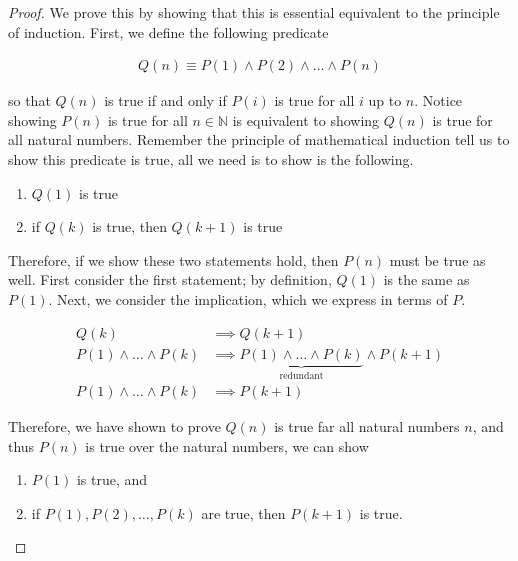 \documentclass[twoside]{report}
\begin{document}
\begin{proof}
	We prove this by showing that this is essential equivalent to the principle of induction. First, we define the following predicate
	
	\begin{align*}
		Q(n) \equiv P(1) \land P(2) \land \dots \land P(n)
	\end{align*}
	
	so that $Q(n)$ is true if and only if $P(i)$ is true for all $i$ up to $n$. Notice showing $P(n)$ is true for all $n \in \mathbb{N}$ is equivalent to showing $Q(n)$ is true for all natural numbers. Remember the principle of mathematical induction tell us to show this predicate is true, all we need is to show is the following.

	\vspace{\baselineskip}
	\begin{enumerate}
		\item $Q(1)$ is true
		\item if $Q(k)$ is true, then $Q(k + 1)$ is true
	\end{enumerate}
	\vspace{\baselineskip}

	Therefore, if we show these two statements hold, then $P(n)$ must be true as well. First consider the first statement; by definition, $Q(1)$ is the same as $P(1)$. Next, we consider the implication, which we express in terms of $P$.
	
	\begin{align*}
		Q(k) &\implies Q(k + 1) \\
		P(1) \land \dots \land P(k) &\implies \underbrace{P(1) \land \dots \land P(k)}_\text{redundant} \land P(k + 1) \\
		P(1) \land \dots \land P(k) &\implies P(k + 1)
	\end{align*}
	
	Therefore, we have shown to prove $Q(n)$ is true far all natural numbers $n$, and thus $P(n)$ is true over the natural numbers, we can show
	
	\vspace{\baselineskip}
	\begin{enumerate}
		\item $P(1)$ is true, and
		\item if $P(1), P(2), \dots, P(k)$ are true, then $P(k + 1)$ is true.
	\end{enumerate}
\end{proof}
\vspace{\baselineskip}
\end{document}
